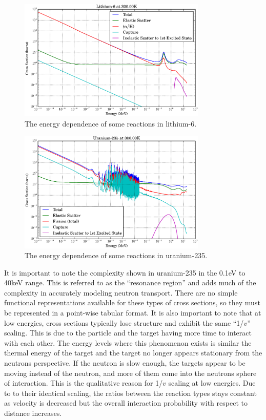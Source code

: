 \begin{figure}[h!]
  \label{xs_e_dependence_li}
  \centering
    \includegraphics[width=0.8\textwidth]{graphics/xs_li6.eps}
     \caption{The energy dependence of some reactions in lithium-6.}
\end{figure}

\begin{figure}[h!]
  \label{xs_e_dependence_u}
  \centering
    \includegraphics[width=0.8\textwidth]{graphics/xs_u235.eps}
    \caption{The energy dependence of some reactions in uranium-235.}
\end{figure}

It is important to note the complexity shown in uranium-235 in the 0.1eV to 40keV range.  This is referred to as the ``resonance region'' and adds much of the complexity in accurately modeling neutron transport.  There are no simple functional representations available for these types of cross sections, so they must be represented in a point-wise tabular format.  It is also important to note that at low energies, cross sections typically lose structure and exhibit the same ``1/$v$'' scaling.  This is due to the particle and the target having more time to interact with each other.  The energy levels where this phenomenon exists is similar the thermal energy of the target and the target no longer appears stationary from the neutrons perspective.  If the neutron is slow enough, the targets appear to be moving instead of the neutron, and more of them come into the neutrons sphere of interaction.  This is the qualitative reason for 1/$v$ scaling at low energies.  Due to to their identical scaling, the ratios between the reaction types stays constant as velocity is decreased but the overall interaction probability with respect to distance increases.

